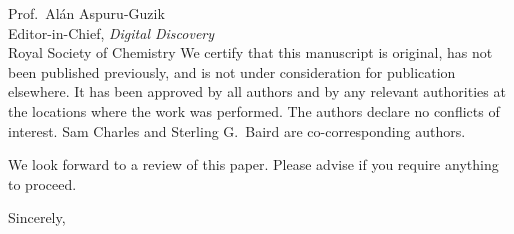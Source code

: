 \documentclass[11pt]{letter}
\begin{document}
\begin{letter}{Prof.\ Al\'an Aspuru-Guzik\\
Editor-in-Chief, \textit{Digital Discovery}\\
Royal Society of Chemistry}
We certify that this manuscript is original, has not been published previously, and is not under consideration for publication elsewhere. It has been approved by all authors and by any relevant authorities at the locations where the work was performed. The authors declare no conflicts of interest. Sam Charles and Sterling G.\ Baird are co-corresponding authors.
%
%

We look forward to a review of this paper. Please advise if you require anything to proceed.

\closing{Sincerely,}

\end{letter}
\end{document}
